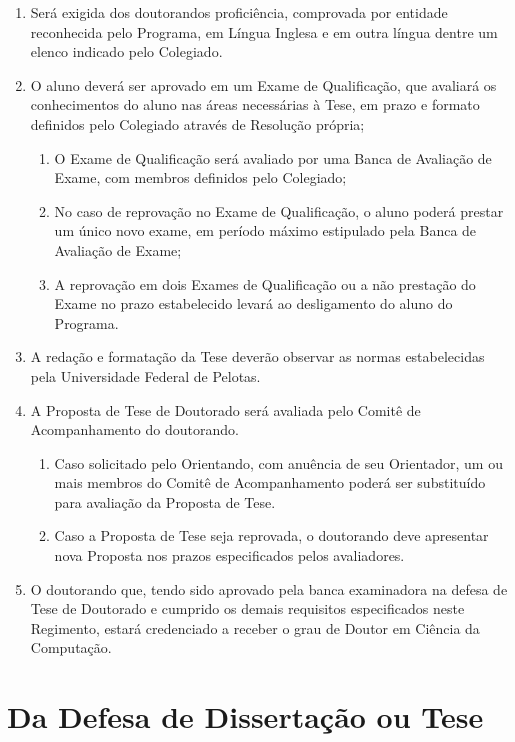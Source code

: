 \documentclass{article}
\begin{document}
\begin{enumerate}
	\item  Será exigida dos doutorandos proficiência, comprovada por entidade reconhecida pelo Programa, em Língua Inglesa e em outra língua dentre um elenco indicado pelo Colegiado.
	\item  O aluno deverá ser aprovado em um Exame de Qualificação, que avaliará os conhecimentos do aluno nas áreas necessárias à Tese, em prazo e formato definidos pelo Colegiado através de Resolução própria;
	\begin{enumerate}
		\item O Exame de Qualificação será avaliado por uma Banca de Avaliação de Exame, com membros definidos pelo Colegiado;
		\item No caso de reprovação no Exame de Qualificação, o aluno poderá prestar um único novo exame, em período máximo estipulado pela Banca de Avaliação de Exame;
		\item A reprovação em dois Exames de Qualificação ou a não prestação do Exame no prazo estabelecido levará ao desligamento do aluno do Programa.
	\end{enumerate}
	\item  A redação e formatação da Tese deverão observar as normas estabelecidas pela Universidade Federal de Pelotas.
	\item  A Proposta de Tese de Doutorado será avaliada pelo Comitê de Acompanhamento do doutorando.
	\begin{enumerate}
		\item Caso solicitado pelo Orientando, com anuência de seu Orientador, um ou mais membros do Comitê de Acompanhamento poderá ser substituído para avaliação da Proposta de Tese.
		\item Caso a Proposta de Tese seja reprovada, o doutorando deve apresentar nova Proposta nos prazos especificados pelos avaliadores.
	\end{enumerate}
	\item  O doutorando que, tendo sido aprovado pela banca examinadora na defesa de Tese de Doutorado e cumprido os demais requisitos especificados neste Regimento, estará credenciado a receber o grau de Doutor em Ciência da Computação.
\end{enumerate}

\section{Da Defesa de Dissertação ou Tese}
\end{document}
